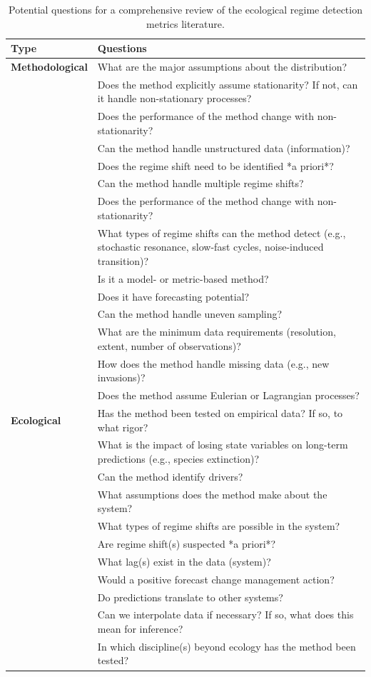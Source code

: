\documentclass[12pt,twoside,openany]{reedthesis}
\begin{document}
\begin{longtable}{>{\bfseries}l|>{\raggedright\arraybackslash}p{30em}}
\caption{\label{tab:nextStepsTab}Potential questions for a comprehensive review of the ecological regime detection metrics literature.}\\
\toprule
Type & Questions\\
\midrule
Methodological & What are the major assumptions about the distribution?\\
 & Does the method explicitly assume stationarity? If not, can it handle non-stationary processes?\\
 & Does the performance of the method change with non-stationarity?\\
 & Can the method handle unstructured data (information)?\\
 & Does the regime shift need to be identified *a priori*?\\
\addlinespace
 & Can the method handle multiple regime shifts?\\
 & Does the performance of the method change with non-stationarity?\\
 & What types of regime shifts can the method detect (e.g., stochastic resonance, slow-fast cycles, noise-induced transition)?\\
 & Is it a model- or metric-based method?\\
 & Does it have forecasting potential?\\
\addlinespace
 & Can the method handle uneven sampling?\\
 & What are the minimum data requirements (resolution, extent, number of observations)?\\
 & How does the method handle missing data (e.g., new invasions)?\\
 & Does the method assume Eulerian or Lagrangian processes?\\
Ecological & Has the method been tested on empirical data? If so, to what rigor?\\
\addlinespace
 & What is the impact of losing state variables on long-term predictions (e.g., species extinction)?\\
 & Can the method identify drivers?\\
 & What assumptions does the method make about the system?\\
 & What types of regime shifts are possible in the system?\\
 & Are regime shift(s) suspected *a priori*?\\
\addlinespace
 & What lag(s) exist in the data (system)?\\
 & Would a positive forecast change management action?\\
 & Do predictions translate to other systems?\\
 & Can we interpolate data if necessary? If so, what does this mean for inference?\\
 & In which discipline(s) beyond ecology has the method been tested?\\
\bottomrule
\end{longtable}
\end{document}
